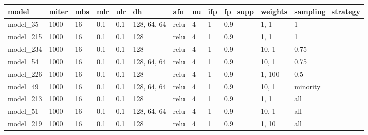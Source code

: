 \begin{tabular}{|l|l|l|l|l|l|l|l|l|l|l|l|}
\hline
\textbf{model} & \textbf{miter} & \textbf{mbs} & \textbf{mlr} & \textbf{ulr} & \textbf{dh} & \textbf{afn} & \textbf{nu} & \textbf{ifp} & \textbf{fp\_supp} & \textbf{weights} & \textbf{sampling\_strategy} \\ \hline
model\_35      & 1000           & 16           & 0.1          & 0.1          & 128, 64, 64 & relu         & 4           & 1            & 0.9               & 1, 1             & 1                           \\ \hline
model\_215     & 1000           & 16           & 0.1          & 0.1          & 128         & relu         & 4           & 1            & 0.9               & 1, 1             & 1                           \\ \hline
model\_234     & 1000           & 16           & 0.1          & 0.1          & 128         & relu         & 4           & 1            & 0.9               & 10, 1            & 0.75                        \\ \hline
model\_54      & 1000           & 16           & 0.1          & 0.1          & 128, 64, 64 & relu         & 4           & 1            & 0.9               & 10, 1            & 0.75                        \\ \hline
model\_226     & 1000           & 16           & 0.1          & 0.1          & 128         & relu         & 4           & 1            & 0.9               & 1, 100           & 0.5                         \\ \hline
model\_49      & 1000           & 16           & 0.1          & 0.1          & 128, 64, 64 & relu         & 4           & 1            & 0.9               & 10, 1            & minority                    \\ \hline
model\_213     & 1000           & 16           & 0.1          & 0.1          & 128         & relu         & 4           & 1            & 0.9               & 1, 1             & all                         \\ \hline
model\_51      & 1000           & 16           & 0.1          & 0.1          & 128, 64, 64 & relu         & 4           & 1            & 0.9               & 10, 1            & all                         \\ \hline
model\_219     & 1000           & 16           & 0.1          & 0.1          & 128         & relu         & 4           & 1            & 0.9               & 1, 10            & all                         \\ \hline

\end{tabular}
